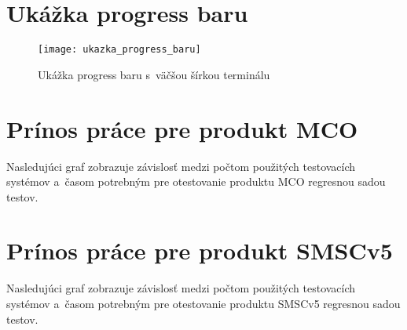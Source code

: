 %
%
\chapter{Ukážka progress baru}
\label{priloha:ukazka_progress_baru}
\begin{figure}[h]
  \begin{center}
    \texttt{[image: ukazka\_progress\_baru]}
    \caption{Ukážka progress baru s~väčšou šírkou terminálu}
  \end{center}
\end{figure}



%
%
\chapter{Prínos práce pre produkt MCO}
\label{priloha:graf_mco}
Nasledujúci graf zobrazuje závislosť medzi počtom použitých testovacích
systémov a~časom potrebným pre otestovanie produktu MCO regresnou 
sadou testov.

\begin{figure}[h!]
\end{figure}



%
%
\chapter{Prínos práce pre produkt SMSCv5}
\label{priloha:graf_smsc}
Nasledujúci graf zobrazuje závislosť medzi počtom použitých testovacích
systémov a~časom potrebným pre otestovanie produktu SMSCv5 regresnou 
sadou testov.

